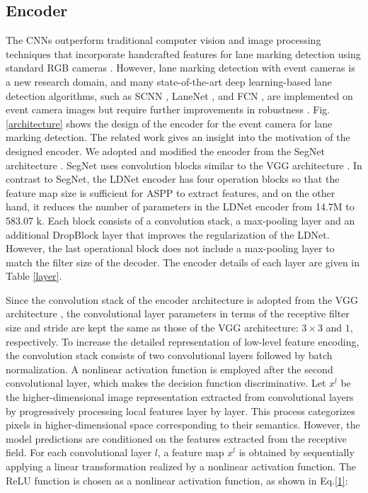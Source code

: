 \documentclass[journal]{IEEEtran}
\begin{document}
\subsection{Encoder}
The CNNs outperform traditional computer vision and image processing techniques that incorporate handcrafted features for lane marking detection using standard RGB cameras \cite{Wu2014} \cite{Deng2013} \cite{Caceres2016}. However, lane marking detection with event cameras is a new research domain, and many state-of-the-art deep learning-based lane detection algorithms, such as SCNN \cite{Pan2017}, LaneNet \cite{Wang2018}, and FCN \cite{Long2015}, are implemented on event camera images but require further improvements in robustness \cite{Cheng2019}. 
Fig.\ref{architecture} shows the design of the encoder for the event camera for lane marking detection. The related work gives an insight into the motivation of the designed encoder. We adopted and modified the encoder from the SegNet architecture \cite{badrinarayanan2017segnet}. SegNet  uses convolution blocks similar to the VGG architecture \cite{vgg}. In contrast to SegNet, the LDNet encoder has four operation blocks so that the feature map size is sufficient for ASPP to extract features, and on the other hand, it reduces the number of parameters in the LDNet encoder from 14.7M to 583.07 k.  Each block consists of a convolution stack,  a max-pooling layer and an additional DropBlock layer that improves the regularization of the LDNet. However, the last operational block does not include a max-pooling layer to match the filter size of the decoder. The encoder details of each layer are given in Table \ref{layer}.
\par
Since the convolution stack of the encoder architecture is adopted from the VGG architecture \cite{vgg}, the convolutional layer parameters in terms of the receptive filter size and stride are kept the same as those of the VGG architecture: $3\times3$ and $1$, respectively. To increase the detailed representation of low-level feature encoding, the convolution stack consists of two convolutional layers followed by batch normalization. A nonlinear activation function is employed after the second convolutional layer, which makes the decision function discriminative. Let $x^l$ be the higher-dimensional image representation extracted from convolutional layers by progressively processing local features layer by layer. This process categorizes pixels in higher-dimensional space corresponding to their semantics. However, the model predictions are conditioned on the features extracted from the receptive field. For each convolutional layer $l$, a feature map $x^l$ is obtained by sequentially applying a linear transformation realized by a nonlinear activation function. The ReLU function is chosen as a nonlinear activation function, as shown in Eq.\ref{1}:
\end{document}
